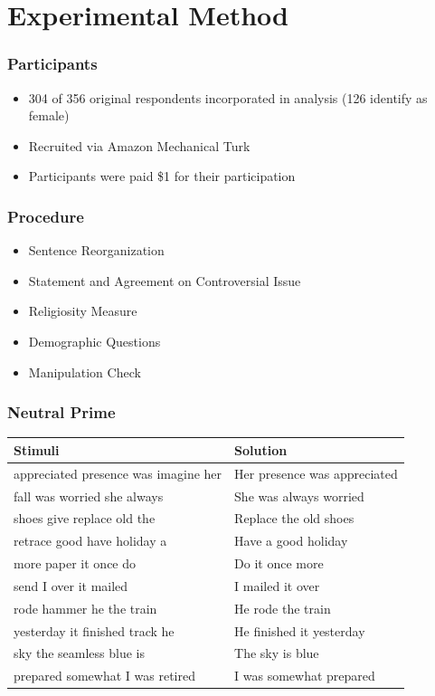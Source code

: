 \documentclass[14pt]{beamer}
\newcommand\tb{\textbf}
\begin{document}
\section{Experimental Method}

\begin{frame}
\frametitle{Participants}
\begin{itemize}
	\item 304 of 356 original respondents incorporated in analysis (126 identify as female)
	\item Recruited via Amazon Mechanical Turk
	\item Participants were paid \$1 for their participation
\end{itemize}
\end{frame}

\begin{frame}
\frametitle{Procedure}
\begin{itemize}
	\item Sentence Reorganization
	\item Statement and Agreement on Controversial Issue
	\item Religiosity Measure
	\item Demographic Questions
	\item Manipulation Check
\end{itemize}
\end{frame}

\begin{frame}
\frametitle{Neutral Prime}
\footnotesize
\begin{table}
	\centering
	\begin{tabular}{ll}
		\hline
		\tb{Stimuli}&\tb{Solution}\\
		\hline
		appreciated presence was imagine her&Her presence was appreciated\\
		fall was worried she always&She was always worried\\
		shoes give replace old the&Replace the old shoes\\
		retrace good have holiday a&Have a good holiday\\
		more paper it once do&Do it once more\\
		send I over it mailed&I mailed it over\\
		rode hammer he the train&He rode the train\\
		yesterday it finished track he&He finished it yesterday\\
		sky the seamless blue is&The sky is blue\\
		prepared somewhat I was retired&I was somewhat prepared\\
		\hline
	\end{tabular}
\end{table}
\end{frame}
\end{document}
